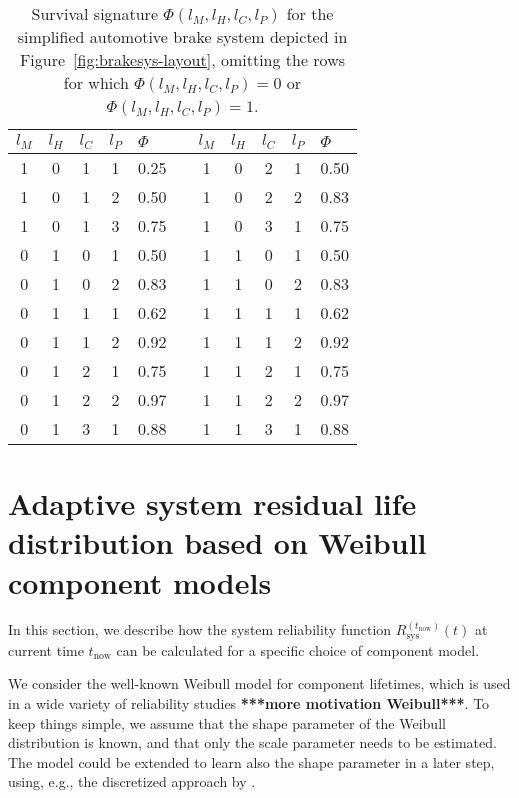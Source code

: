 \documentclass[authoryear]{elsarticle}
\def\tnow{t_\text{now}}
\newcommand{\Rsysnow}{R^{(t_\text{now})}_\text{sys}}
\begin{document}
\begin{table}
\centering
\begin{tabular}{cccclcccccl}
  \toprule
$l_M$ & $l_H$ & $l_C$ & $l_P$ & $\Phi$ & \quad & $l_M$ & $l_H$ & $l_C$ & $l_P$ & $\Phi$\\ 
  \midrule
1 & 0 & 1 & 1 & 0.25 & & 1 & 0 & 2 & 1 & 0.50 \\ 
1 & 0 & 1 & 2 & 0.50 & & 1 & 0 & 2 & 2 & 0.83 \\ 
1 & 0 & 1 & 3 & 0.75 & & 1 & 0 & 3 & 1 & 0.75 \\ 
0 & 1 & 0 & 1 & 0.50 & & 1 & 1 & 0 & 1 & 0.50 \\ 
0 & 1 & 0 & 2 & 0.83 & & 1 & 1 & 0 & 2 & 0.83 \\ 
0 & 1 & 1 & 1 & 0.62 & & 1 & 1 & 1 & 1 & 0.62 \\ 
0 & 1 & 1 & 2 & 0.92 & & 1 & 1 & 1 & 2 & 0.92 \\ 
0 & 1 & 2 & 1 & 0.75 & & 1 & 1 & 2 & 1 & 0.75 \\ 
0 & 1 & 2 & 2 & 0.97 & & 1 & 1 & 2 & 2 & 0.97 \\ 
0 & 1 & 3 & 1 & 0.88 & & 1 & 1 & 3 & 1 & 0.88 \\ 
   \bottomrule
\end{tabular}
\caption{Survival signature $\Phi(l_M, l_H, l_C, l_P)$
for the simplified automotive brake system depicted in Figure~\ref{fig:brakesys-layout},
omitting the rows for which $\Phi(l_M, l_H, l_C, l_P) = 0$ or $\Phi(l_M, l_H, l_C, l_P) = 1$.}
\label{tab:brakesys-survsign}
\end{table}


\section{Adaptive system residual life distribution based on Weibull component models}
\label{sec:adaptive-sysrel-weibull}

In this section, we describe how the system reliability function $\Rsysnow(t)$ at current time $\tnow$ 
can be calculated for a specific choice of component model.

We consider the well-known Weibull model for component lifetimes,
which is used in a wide variety of reliability studies \textbf{***more motivation Weibull***}. 
To keep things simple, we assume that the shape parameter of the Weibull distribution is known,
and that only the scale parameter needs to be estimated.
The model could be extended to learn also the shape parameter in a later step,
using, e.g., the discretized approach by \cite{1969:soland}.
\end{document}
